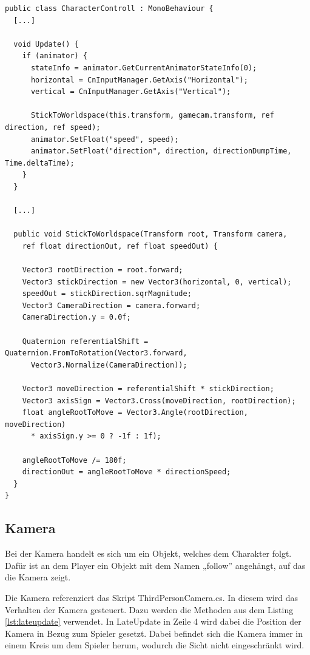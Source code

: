 \begin{scriptsize}
\lstset{
	float,
	caption=Skript: CharacterControll.cs, 
	language=[Sharp]C, 
	frame=single,  
	showstringspaces=false, 
	showspaces=false, 
	numbers=left, 
	captionpos=b, 
	belowcaptionskip=4pt,
	basicstyle=\ttfamily
} 
\begin{lstlisting}[label=lst:charactercontroller]
public class CharacterControll : MonoBehaviour {
  [...]	
	
  void Update() {  
    if (animator) {
      stateInfo = animator.GetCurrentAnimatorStateInfo(0);
      horizontal = CnInputManager.GetAxis("Horizontal");
      vertical = CnInputManager.GetAxis("Vertical");
      
      StickToWorldspace(this.transform, gamecam.transform, ref direction, ref speed);
      animator.SetFloat("speed", speed);
      animator.SetFloat("direction", direction, directionDumpTime, Time.deltaTime);
    }
  }
    
  [...]

  public void StickToWorldspace(Transform root, Transform camera, 
    ref float directionOut, ref float speedOut) {
    
    Vector3 rootDirection = root.forward;
    Vector3 stickDirection = new Vector3(horizontal, 0, vertical);
    speedOut = stickDirection.sqrMagnitude;
    Vector3 CameraDirection = camera.forward;
    CameraDirection.y = 0.0f;
    
    Quaternion referentialShift = Quaternion.FromToRotation(Vector3.forward, 
      Vector3.Normalize(CameraDirection));
        	
    Vector3 moveDirection = referentialShift * stickDirection;
    Vector3 axisSign = Vector3.Cross(moveDirection, rootDirection);
    float angleRootToMove = Vector3.Angle(rootDirection, moveDirection) 
      * axisSign.y >= 0 ? -1f : 1f);      
        	
    angleRootToMove /= 180f;
    directionOut = angleRootToMove * directionSpeed;
  }
}
\end{lstlisting}
\end{scriptsize}

		\subsection{Kamera}
			Bei der Kamera handelt es sich um ein Objekt, welches dem Charakter folgt. Dafür ist an dem Player ein Objekt mit dem Namen „follow” angehängt, auf das die Kamera zeigt. 
	
			Die Kamera referenziert das Skript ThirdPersonCamera.cs. In diesem wird das Verhalten der Kamera gesteuert. Dazu werden die Methoden aus dem Listing \ref{lst:lateupdate} verwendet. In LateUpdate in Zeile 4 wird dabei die Position der Kamera in Bezug zum Spieler gesetzt. Dabei befindet sich die Kamera immer in einem Kreis um dem Spieler herum, wodurch die Sicht nicht eingeschränkt wird.

